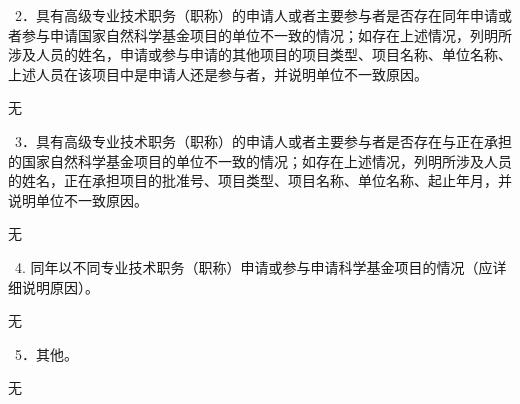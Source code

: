 \documentclass[UTF8,A4]{ctexart}
\newcommand{\blue}{\textcolor[rgb]{0.00,0.44,0.75}}
\begin{document}
\begin{spacing}{1.6}
\kaishu
\blue{~2．具有高级专业技术职务（职称）的申请人或者主要参与者是否存在同年申请或者参与申请国家自然科学基金项目的单位不一致的情况；如存在上述情况，列明所涉及人员的姓名，申请或参与申请的其他项目的项目类型、项目名称、单位名称、上述人员在该项目中是申请人还是参与者，并说明单位不一致原因。}
\end{spacing}
无
\begin{spacing}{1.6}
\kaishu
\blue{~3．具有高级专业技术职务（职称）的申请人或者主要参与者是否存在与正在承担的国家自然科学基金项目的单位不一致的情况；如存在上述情况，列明所涉及人员的姓名，正在承担项目的批准号、项目类型、项目名称、单位名称、起止年月，并说明单位不一致原因。}
\end{spacing}
无

\begin{spacing}{1.6}
\kaishu
\blue{~4. 同年以不同专业技术职务（职称）申请或参与申请科学基金项目的情况（应详细说明原因）。}
\end{spacing}
无


\begin{spacing}{1.6}
\kaishu
\blue{~5．其他。}
\end{spacing}
无
\end{document}
